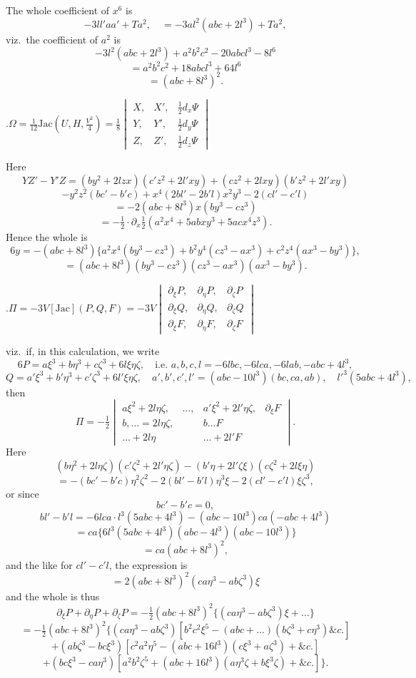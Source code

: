 \documentclass[11pt,a4paper]{article}
\begin{document}
The whole coefficient of $x^{6}$ is
\[
  -3ll'aa'+Ta^{2},\quad =-3al^{2}(abc+2l^{3})+Ta^{2},
\]
viz.\ the coefficient of $a^{2}$ is
\[
  -3l^{2}(abc+2l^{3})+a^{2}b^{2}c^{2}-20abcl^{3}-8l^{6}
\]
\[
  = a^{2}b^{2}c^{2}+18abcl^{3}+64l^{6}
\]
\[
  = (abc+8l^{3})^{2}.
\]

\medskip{}.\quad $\Omega=\tfrac{1}{12}\mathrm{Jac}\!\left(U,H,\tfrac{V^{2}}{4}\right)=\tfrac{1}{8}\begin{vmatrix} X,&X',&\tfrac{1}{2}d_{x}\Psi\\ Y,&Y',&\tfrac{1}{2}d_{y}\Psi\\ Z,&Z',&\tfrac{1}{2}d_{z}\Psi \end{vmatrix}$

\newpage
\noindent
Here
\[
  YZ'-Y'Z = (by^{2}+2lzx)(c'z^{2}+2l'xy)+(cz^{2}+2lxy)(b'z^{2}+2l'xy)
\]
\[
  -y^{2}z^{2}(bc'-b'c)+x^{4}(2bl'-2b'l)x^{2}y^{3}-2(cl'-c'l)
\]
\[
  =-2(abc+8l^{3})x(by^{3}-cz^{3})
\]
\[
  =-\tfrac{1}{2}\cdot\partial_{x}\tfrac{1}{2}(a^{2}x^{4}+5abxy^{3}+5acx^{4}z^{3}).
\]
Hence the whole is
\[
  6y=-(abc+8l^{3})\{a^{2}x^{4}(by^{3}-cz^{3})+b^{2}y^{4}(cz^{3}-ax^{3})+c^{2}z^{4}(ax^{3}-by^{3})\},
\]
\[
  =(abc+8l^{3})(by^{3}-cz^{3})(cz^{3}-ax^{3})(ax^{3}-by^{3}).
\]

\medskip{}.\quad $\Pi=-3V[\mathrm{Jac}](P,Q,F)=-3V\begin{vmatrix} \partial_{\xi}P,&\partial_{\eta}P,&\partial_{\zeta}P\\ \partial_{\xi}Q,&\partial_{\eta}Q,&\partial_{\zeta}Q\\ \partial_{\xi}F,&\partial_{\eta}F,&\partial_{\zeta}F \end{vmatrix}$

viz.\ if, in this calculation, we write
\[
  6P = a\xi^{3}+b\eta^{3}+c\zeta^{3}+6l\xi\eta\zeta,\quad\text{i.e.\ } a,b,c,l=-6lbc,-6lca,-6lab,-abc+4l^{3},
\]
\[
  Q = a'\xi^{3}+b'\eta^{3}+c'\zeta^{3}+6l'\xi\eta\zeta,\quad a',b',c',l'=(abc-10l^{3})(bc,ca,ab),\quad l'^{3}(5abc+4l^{3}),
\]
then
\[
  \Pi = -\tfrac{1}{2}\begin{vmatrix} a\xi^{2}+2l\eta\zeta,&\ldots,&a'\xi^{2}+2l'\eta\zeta,&\partial_{\xi}F\\ b,\ldots=2l\eta\zeta,&&b\ldots F\\ \ldots+2l\eta&&\ldots+2l'F \end{vmatrix}.
\]
Here
\[
  (b\eta^{2}+2l\eta\zeta)(c'\zeta^{2}+2l'\eta\zeta)-(b'\eta+2l'\zeta\xi)(c\zeta^{2}+2l\xi\eta)
\]
\[
  =-(bc'-b'c)\eta^{2}\zeta^{2}-2(bl'-b'l)\eta^{3}\xi-2(cl'-c'l)\xi\zeta^{3},
\]
or since
\[
  bc'-b'c=0,
\]
\[
  bl'-b'l=-6lca\cdot l^{3}(5abc+4l^{3})-(abc-10l^{3})ca(-abc+4l^{3})
\]
\[
  = ca\{6l^{3}(5abc+4l^{3})(abc-4l^{3})(abc-10l^{3})\}
\]
\[
  = ca(abc+8l^{3})^{2},
\]
and the like for $cl'-c'l$, the expression is
\[
  =2(abc+8l^{3})^{2}(ca\eta^{3}-ab\zeta^{3})\xi
\]
and the whole is thus
\[
  \partial_{\xi}P+\partial_{\eta}P+\partial_{\zeta}P=-\tfrac{1}{2}(abc+8l^{3})^{2}\{(ca\eta^{3}-ab\zeta^{3})\xi+\ldots\}
\]
\[
  =-\tfrac{1}{2}(abc+8l^{3})^{2}\{(ca\eta^{3}-ab\zeta^{3})[b^{2}c^{2}\xi^{5}-(abc+\ldots)(b\zeta^{3}+c\eta^{3})\&c.]
\]
\[
  +(ab\zeta^{3}-bc\xi^{3})[c^{2}a^{2}\eta^{5}-(abc+16l^{3})(c\xi^{3}+a\zeta^{3})+\&c.]
\]
\[
  +(bc\xi^{3}-ca\eta^{3})[a^{2}b^{2}\zeta^{5}+(abc+16l^{3})(a\eta^{3}\zeta+b\xi^{3}\zeta)+\&c.]\}.
\]
\end{document}

